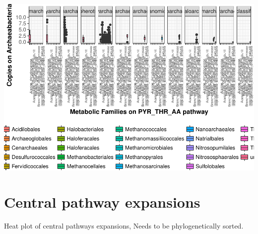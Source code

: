 \documentclass[12pt,twoside]{reedthesis}
\begin{document}
  \begin{center}\includegraphics{tesis_files/figure-latex/ArcheaeBoxPlotByPhylum-10} \end{center}
  
  \begin{Shaded}
  \begin{Highlighting}[]
  
  \end{Highlighting}
  \end{Shaded}
  
  \clearpage 
  
  \section{Central pathway expansions}\label{central-pathway-expansions}
  
  Heat plot of central pathways expansions, Needs to be phylogenetically
  sorted.
  
\end{document}
